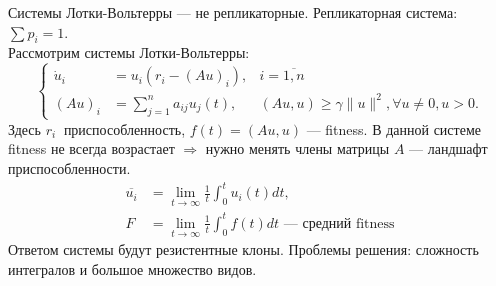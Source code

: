 Системы Лотки-Вольтерры --- не репликаторные. Репликаторная система: $\sum p_{i} = 1$.\\
Рассмотрим системы Лотки-Вольтерры:
\begin{equation*}
	\left\lbrace 
		\begin{array}{lll}
			\dot{u}_{i} &= u_{i} \left(r_i - \left(Au\right)_i\right), &i = \overline{1,n}\\
			\left(Au\right)_i &= \sum_{j = 1}^{n} a_{ij}u_{j}(t), &\left(Au, u\right) \geqslant \gamma \parallel u \parallel ^{2}, \forall u \neq 0, u > 0.
		\end{array}
	\right.
\end{equation*}
Здесь $r_{i} ~$ приспособленность, $f(t) = \left(Au, u\right)$ --- fitness. В данной системе fitness не всегда возрастает $\Rightarrow$ нужно менять члены матрицы $A$ --- ландшафт приспособленности.
\begin{equation*}
	\begin{array}{ll}
		\overline{u_{i}} &= \lim\limits_{t\rightarrow \infty} \frac{1}{t} \int_{0}^{t} u_{i}(t)dt,\\
		F &= \lim\limits_{t \rightarrow \infty} \frac{1}{t} \int_{0}^{t} f(t)dt \text{ --- средний fitness}
	\end{array}
\end{equation*}
Ответом системы будут резистентные клоны. Проблемы решения: сложность интегралов и большое множество видов.


